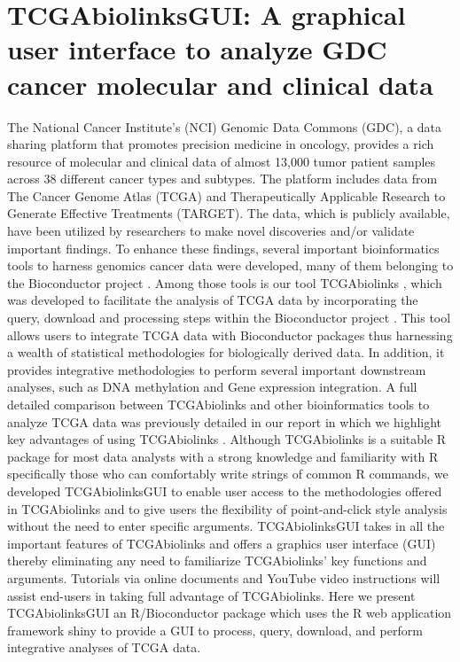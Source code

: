 \newpage



\section{TCGAbiolinksGUI: A graphical user interface to analyze GDC cancer molecular and clinical data}

The National Cancer Institute's (NCI) Genomic Data Commons (GDC), a data sharing platform that promotes precision medicine in oncology, provides a rich resource of molecular and clinical data of  almost 13,000 tumor patient samples across 38 different cancer types and subtypes. The platform includes data from The Cancer Genome Atlas (TCGA) and Therapeutically Applicable Research to Generate Effective Treatments (TARGET). The data, which is publicly available, have been utilized by researchers to make novel discoveries and/or validate important findings. To enhance these findings, several important bioinformatics tools to harness genomics cancer data were developed, many of them belonging to the Bioconductor project \cite{gentleman2004bioconductor}. Among those tools is our tool TCGAbiolinks \cite{TCGAbiolinks}, which was developed to facilitate the analysis of TCGA data by incorporating the query, download and processing steps within the Bioconductor project \cite{gentleman2004bioconductor}. This tool allows users to integrate TCGA data with Bioconductor packages thus harnessing a wealth of statistical methodologies for biologically derived data. In addition, it provides integrative methodologies to perform several important downstream analyses, such as DNA methylation and Gene expression integration. A full detailed comparison between TCGAbiolinks and other bioinformatics tools to analyze TCGA data was previously detailed in our report in which we highlight key advantages of using TCGAbiolinks  \cite{TCGAbiolinks}. Although TCGAbiolinks is a suitable R package for most data analysts with a strong knowledge and familiarity with R specifically those who can comfortably write strings of common R commands, we developed TCGAbiolinksGUI to enable user access to the methodologies offered in TCGAbiolinks and to give users the flexibility of point-and-click style analysis without the need to enter specific arguments. TCGAbiolinksGUI takes in all the important features of TCGAbiolinks and offers a graphics user interface (GUI) thereby eliminating any need to familiarize TCGAbiolinks' key functions and arguments.  Tutorials via online documents and YouTube video instructions will assist end-users in taking full advantage of TCGAbiolinks.
Here we present TCGAbiolinksGUI an R/Bioconductor package which uses the R web application framework shiny \cite{shiny} to provide a GUI to process, query, download, and perform integrative analyses of TCGA data.

